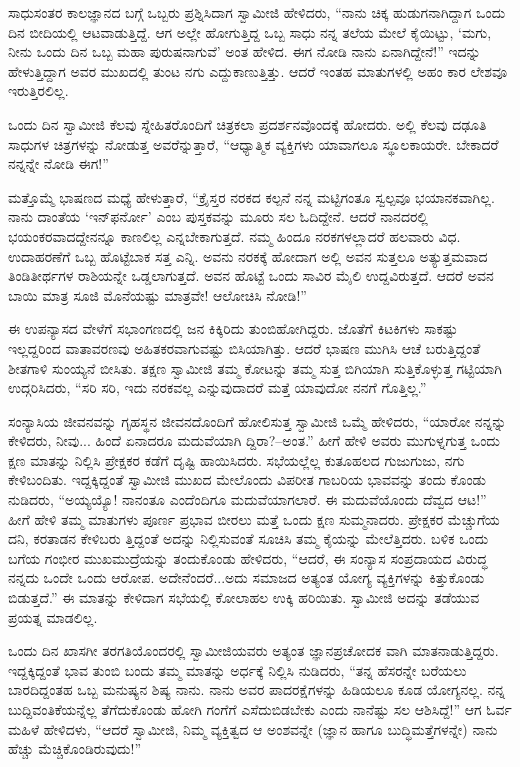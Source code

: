 ಸಾಧುಸಂತರ ಕಾಲಜ್ಞಾನದ ಬಗ್ಗೆ ಒಬ್ಬರು ಪ್ರಶ್ನಿಸಿದಾಗ ಸ್ವಾಮೀಜಿ ಹೇಳಿದರು, “ನಾನು ಚಿಕ್ಕ ಹುಡುಗನಾಗಿದ್ದಾಗ ಒಂದು ದಿನ ಬೀದಿಯಲ್ಲಿ ಆಟವಾಡುತ್ತಿದ್ದೆ. ಆಗ ಅಲ್ಲೇ ಹೋಗುತ್ತಿದ್ದ ಒಬ್ಬ ಸಾಧು ನನ್ನ ತಲೆಯ ಮೇಲೆ ಕೈಯಿಟ್ಟು, ‘ಮಗು, ನೀನು ಒಂದು ದಿನ ಒಬ್ಬ ಮಹಾ ಪುರುಷನಾಗುವೆ’ ಅಂತ ಹೇಳಿದ. ಈಗ ನೋಡಿ ನಾನು ಏನಾಗಿದ್ದೇನೆ!” ಇದನ್ನು ಹೇಳುತ್ತಿದ್ದಾಗ ಅವರ ಮುಖದಲ್ಲಿ ತುಂಟ ನಗು ಎದ್ದುಕಾಣುತ್ತಿತ್ತು. ಆದರೆ ಇಂತಹ ಮಾತುಗಳಲ್ಲಿ ಅಹಂ ಕಾರ ಲೇಶವೂ ಇರುತ್ತಿರಲಿಲ್ಲ.

ಒಂದು ದಿನ ಸ್ವಾಮೀಜಿ ಕೆಲವು ಸ್ನೇಹಿತರೊಂದಿಗೆ ಚಿತ್ರಕಲಾ ಪ್ರದರ್ಶನವೊಂದಕ್ಕೆ ಹೋದರು. ಅಲ್ಲಿ ಕೆಲವು ದಢೂತಿ ಸಾಧುಗಳ ಚಿತ್ರಗಳನ್ನು ನೋಡುತ್ತ ಅವರೆನ್ನುತ್ತಾರೆ, “ಆಧ್ಯಾತ್ಮಿಕ ವ್ಯಕ್ತಿಗಳು ಯಾವಾಗಲೂ ಸ್ಥೂಲಕಾಯರೇ. ಬೇಕಾದರೆ ನನ್ನನ್ನೇ ನೋಡಿ ಈಗ!”

ಮತ್ತೊಮ್ಮೆ ಭಾಷಣದ ಮಧ್ಯೆ ಹೇಳುತ್ತಾರೆ, “ಕ್ರೈಸ್ತರ ನರಕದ ಕಲ್ಪನೆ ನನ್ನ ಮಟ್ಟಿಗಂತೂ ಸ್ವಲ್ಪವೂ ಭಯಾನಕವಾಗಿಲ್ಲ. ನಾನು ದಾಂತೆಯ ‘ಇನ್​ಫರ್ನೋ’ ಎಂಬ ಪುಸ್ತಕವನ್ನು ಮೂರು ಸಲ ಓದಿದ್ದೇನೆ. ಆದರೆ ನಾನದರಲ್ಲಿ ಭಯಂಕರವಾದದ್ದೇನನ್ನೂ ಕಾಣಲಿಲ್ಲ ಎನ್ನಬೇಕಾಗುತ್ತದೆ. ನಮ್ಮ ಹಿಂದೂ ನರಕಗಳಲ್ಲಾದರೆ ಹಲವಾರು ವಿಧ. ಉದಾಹರಣೆಗೆ ಒಬ್ಬ ಹೊಟ್ಟೆಬಾಕ ಸತ್ತ ಎನ್ನಿ. ಅವನು ನರಕಕ್ಕೆ ಹೋದಾಗ ಅಲ್ಲಿ ಅವನ ಸುತ್ತಲೂ ಅತ್ಯುತ್ತಮವಾದ ತಿಂಡಿತೀರ್ಥಗಳ ರಾಶಿಯನ್ನೇ ಒಡ್ಡಲಾಗುತ್ತದೆ. ಅವನ ಹೊಟ್ಟೆ ಒಂದು ಸಾವಿರ ಮೈಲಿ ಉದ್ದವಿರುತ್ತದೆ. ಆದರೆ ಅವನ ಬಾಯಿ ಮಾತ್ರ ಸೂಜಿ ಮೊನೆಯಷ್ಟು ಮಾತ್ರವೇ! ಆಲೋಚಿಸಿ ನೋಡಿ!”

ಈ ಉಪನ್ಯಾಸದ ವೇಳೆಗೆ ಸಭಾಂಗಣದಲ್ಲಿ ಜನ ಕಿಕ್ಕಿರಿದು ತುಂಬಿಹೋಗಿದ್ದರು. ಜೊತೆಗೆ ಕಿಟಕಿಗಳು ಸಾಕಷ್ಟು ಇಲ್ಲದ್ದರಿಂದ ವಾತಾವರಣವು ಅಹಿತಕರವಾಗುವಷ್ಟು ಬಿಸಿಯಾಗಿತ್ತು. ಆದರೆ ಭಾಷಣ ಮುಗಿಸಿ ಆಚೆ ಬರುತ್ತಿದ್ದಂತೆ ಶೀತಗಾಳಿ ಸುಂಯ್ಯನೆ ಬೀಸಿತು. ತಕ್ಷಣ ಸ್ವಾಮೀಜಿ ತಮ್ಮ ಕೋಟನ್ನು ತಮ್ಮ ಸುತ್ತ ಬಿಗಿಯಾಗಿ ಸುತ್ತಿಕೊಳ್ಳುತ್ತ ಗಟ್ಟಿಯಾಗಿ ಉದ್ಗರಿಸಿದರು, “ಸರಿ ಸರಿ, ಇದು ನರಕವಲ್ಲ ಎನ್ನುವುದಾದರೆ ಮತ್ತೆ ಯಾವುದೋ ನನಗೆ ಗೊತ್ತಿಲ್ಲ.”

ಸಂನ್ಯಾಸಿಯ ಜೀವನವನ್ನು ಗೃಹಸ್ಥನ ಜೀವನದೊಂದಿಗೆ ಹೋಲಿಸುತ್ತ ಸ್ವಾಮೀಜಿ ಒಮ್ಮೆ ಹೇಳಿದರು, “ಯಾರೋ ನನ್ನನ್ನು ಕೇಳಿದರು, ನೀವು... ಹಿಂದೆ ಏನಾದರೂ ಮದುವೆಯಾಗಿ ದ್ದಿರಾ?–ಅಂತ.” ಹೀಗೆ ಹೇಳಿ ಅವರು ಮುಗುಳ್ನಗುತ್ತ ಒಂದು ಕ್ಷಣ ಮಾತನ್ನು ನಿಲ್ಲಿಸಿ ಪ್ರೇಕ್ಷಕರ ಕಡೆಗೆ ದೃಷ್ಟಿ ಹಾಯಿಸಿದರು. ಸಭೆಯಲ್ಲೆಲ್ಲ ಕುತೂಹಲದ ಗುಜುಗುಜು, ನಗು ಕೇಳಿಬಂದಿತು. ಇದ್ದಕ್ಕಿದ್ದಂತೆ ಸ್ವಾಮೀಜಿ ಮುಖದ ಮೇಲೊಂದು ವಿಪರೀತ ಗಾಬರಿಯ ಭಾವವನ್ನು ತಂದು ಕೊಂಡು ನುಡಿದರು, “ಅಯ್ಯಯ್ಯೊ! ನಾನಂತೂ ಎಂದೆಂದಿಗೂ ಮದುವೆಯಾಗಲಾರೆ. ಈ ಮದುವೆಯೊಂದು ದೆವ್ವದ ಆಟ!” ಹೀಗೆ ಹೇಳಿ ತಮ್ಮ ಮಾತುಗಳು ಪೂರ್ಣ ಪ್ರಭಾವ ಬೀರಲು ಮತ್ತೆ ಒಂದು ಕ್ಷಣ ಸುಮ್ಮನಾದರು. ಪ್ರೇಕ್ಷಕರ ಮೆಚ್ಚುಗೆಯ ದನಿ, ಕರತಾಡನ ಕೇಳಿಬರು ತ್ತಿದ್ದಂತೆ ಅದನ್ನು ನಿಲ್ಲಿಸುವಂತೆ ಸೂಚಿಸಿ ತಮ್ಮ ಕೈಯನ್ನು ಮೇಲೆತ್ತಿದರು. ಬಳಿಕ ಒಂದು ಬಗೆಯ ಗಂಭೀರ ಮುಖಮುದ್ರೆಯನ್ನು ತಂದುಕೊಂಡು ಹೇಳಿದರು, “ಆದರೆ, ಈ ಸಂನ್ಯಾಸ ಸಂಪ್ರದಾಯದ ವಿರುದ್ಧ ನನ್ನದು ಒಂದೇ ಒಂದು ಆರೋಪ. ಅದೇನೆಂದರೆ...ಅದು ಸಮಾಜದ ಅತ್ಯಂತ ಯೋಗ್ಯ ವ್ಯಕ್ತಿಗಳನ್ನು ಕಿತ್ತುಕೊಂಡು ಬಿಡುತ್ತದೆ.” ಈ ಮಾತನ್ನು ಕೇಳಿದಾಗ ಸಭೆಯಲ್ಲಿ ಕೋಲಾಹಲ ಉಕ್ಕಿ ಹರಿಯಿತು. ಸ್ವಾಮೀಜಿ ಅದನ್ನು ತಡೆಯುವ ಪ್ರಯತ್ನ ಮಾಡಲಿಲ್ಲ.

ಒಂದು ದಿನ ಖಾಸಗೀ ತರಗತಿಯೊಂದರಲ್ಲಿ ಸ್ವಾಮೀಜಿಯವರು ಅತ್ಯಂತ ಜ್ಞಾನಪ್ರಚೋದಕ ವಾಗಿ ಮಾತನಾಡುತ್ತಿದ್ದರು. ಇದ್ದಕ್ಕಿದ್ದಂತೆ ಭಾವ ತುಂಬಿ ಬಂದು ತಮ್ಮ ಮಾತನ್ನು ಅರ್ಧಕ್ಕೆ ನಿಲ್ಲಿಸಿ ನುಡಿದರು, “ತನ್ನ ಹೆಸರನ್ನೇ ಬರೆಯಲು ಬಾರದಿದ್ದಂತಹ ಒಬ್ಬ ಮನುಷ್ಯನ ಶಿಷ್ಯ ನಾನು. ನಾನು ಅವರ ಪಾದರಕ್ಷೆಗಳನ್ನು ಹಿಡಿಯಲೂ ಕೂಡ ಯೋಗ್ಯನಲ್ಲ. ನನ್ನ ಬುದ್ದಿವಂತಿಕೆಯನ್ನೆಲ್ಲ ತೆಗೆದುಕೊಂಡು ಹೋಗಿ ಗಂಗೆಗೆ ಎಸೆದುಬಿಡಬೇಕು ಎಂದು ನಾನೆಷ್ಟು ಸಲ ಆಶಿಸಿದ್ದೆ!” ಆಗ ಓರ್ವ ಮಹಿಳೆ ಹೇಳಿದಳು, “ಆದರೆ ಸ್ವಾಮೀಜಿ, ನಿಮ್ಮ ವ್ಯಕ್ತಿತ್ವದ ಆ ಅಂಶವನ್ನೇ (ಜ್ಞಾನ ಹಾಗೂ ಬುದ್ಧಿಮತ್ತೆಗಳನ್ನೇ) ನಾನು ಹೆಚ್ಚು ಮೆಚ್ಚಿಕೊಂಡಿರುವುದು!”

